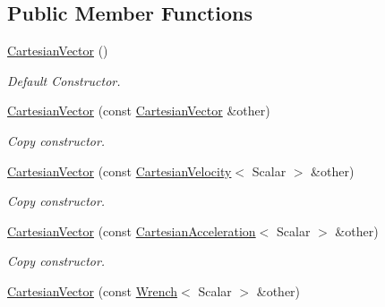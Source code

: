 \subsection*{Public Member Functions}
\begin{DoxyCompactItemize}
\item 
\hyperlink{classow__core_1_1CartesianVector_ab8d2cc93298ac8ee076c3dbd2b645daa}{Cartesian\+Vector} ()\hypertarget{classow__core_1_1CartesianVector_ab8d2cc93298ac8ee076c3dbd2b645daa}{}\label{classow__core_1_1CartesianVector_ab8d2cc93298ac8ee076c3dbd2b645daa}

\begin{DoxyCompactList}\small\item\em Default Constructor. \end{DoxyCompactList}\item 
\hyperlink{classow__core_1_1CartesianVector_ae54731a38d98d155c63de66302b6d4b4}{Cartesian\+Vector} (const \hyperlink{classow__core_1_1CartesianVector}{Cartesian\+Vector} \&other)\hypertarget{classow__core_1_1CartesianVector_ae54731a38d98d155c63de66302b6d4b4}{}\label{classow__core_1_1CartesianVector_ae54731a38d98d155c63de66302b6d4b4}

\begin{DoxyCompactList}\small\item\em Copy constructor. \end{DoxyCompactList}\item 
\hyperlink{classow__core_1_1CartesianVector_a9a6c2a406b2faaca209e7e59b0108e71}{Cartesian\+Vector} (const \hyperlink{classow__core_1_1CartesianVelocity}{Cartesian\+Velocity}$<$ Scalar $>$ \&other)\hypertarget{classow__core_1_1CartesianVector_a9a6c2a406b2faaca209e7e59b0108e71}{}\label{classow__core_1_1CartesianVector_a9a6c2a406b2faaca209e7e59b0108e71}

\begin{DoxyCompactList}\small\item\em Copy constructor. \end{DoxyCompactList}\item 
\hyperlink{classow__core_1_1CartesianVector_abf1ea5b55eacb7a93f093a51b499f6dc}{Cartesian\+Vector} (const \hyperlink{classow__core_1_1CartesianAcceleration}{Cartesian\+Acceleration}$<$ Scalar $>$ \&other)\hypertarget{classow__core_1_1CartesianVector_abf1ea5b55eacb7a93f093a51b499f6dc}{}\label{classow__core_1_1CartesianVector_abf1ea5b55eacb7a93f093a51b499f6dc}

\begin{DoxyCompactList}\small\item\em Copy constructor. \end{DoxyCompactList}\item 
\hyperlink{classow__core_1_1CartesianVector_a22d0f654b5f49042d9f8128ff6ac714b}{Cartesian\+Vector} (const \hyperlink{classow__core_1_1Wrench}{Wrench}$<$ Scalar $>$ \&other)\hypertarget{classow__core_1_1CartesianVector_a22d0f654b5f49042d9f8128ff6ac714b}{}\label{classow__core_1_1CartesianVector_a22d0f654b5f49042d9f8128ff6ac714b}


\end{DoxyCompactItemize}
